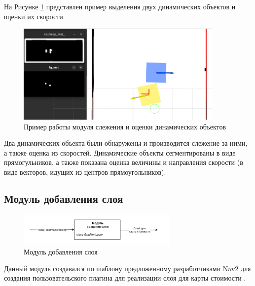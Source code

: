 На Рисунке \ref*{fig:tracking-example} представлен пример выделения двух динамических объектов и оценки их скорости.

\begin{figure}[H]
    \centering
    \includegraphics[width=0.9\textwidth]{images/chap_3/tracking-example.png}
    \caption{Пример работы модуля слежения и оценки динамических объектов}
    \label{fig:tracking-example}
\end{figure}

Два динамических объекта были обнаружены и производится слежение за ними, а также оценка из скоростей. Динамические объекты сегментированы в виде прямогульников, а также показана оценка величины и направления скорости (в виде векторов, идущих из центров прямоугольников).

\subsection{Модуль добавления слоя}

\begin{figure}[H]
    \centering
    \includegraphics[width=0.7\textwidth]{images/chap_3/layes_creation.png}
    \caption{Модуль добавления слоя}
    \label{fig:layes_creation}
\end{figure}

Данный модуль создавался по шаблону предложенному разработчиками Nav2 для создания пользовательского плагина для реализации слоя для карты стоимости \cite{layer-plugin-nav2}.

